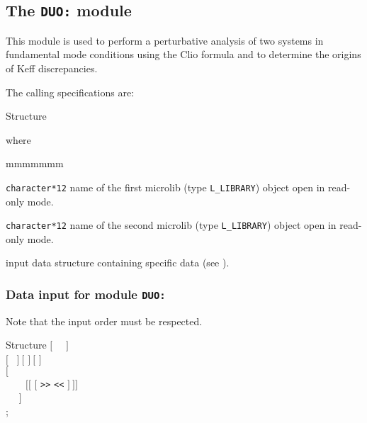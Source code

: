 \subsection{The {\tt DUO:} module}\label{sect:DUOData}

This module is used to perform a perturbative analysis of two systems in fundamental mode conditions using the Clio formula and to determine the origins
of Keff discrepancies.

\vskip 0.02cm

The calling specifications are:

\begin{DataStructure}{Structure }
~~~\moc{::}~ \\
\end{DataStructure}

\noindent where
\begin{ListeDeDescription}{mmmmmmm}

\item[\dusa{MICLIB1}] {\tt character*12} name of the first {\sc microlib} (type {\tt L\_LIBRARY}) object open in read-only mode.

\item[\dusa{MICLIB2}] {\tt character*12} name of the second {\sc microlib} (type {\tt L\_LIBRARY}) object open in read-only mode.

\item[\dusa{DUO\_data}] input data structure containing specific data (see ).

\end{ListeDeDescription}

\subsubsection{Data input for module {\tt DUO:}}\label{sect:descDUO}

Note that the input order must be respected.

\vskip -0.5cm

\begin{DataStructure}{Structure }
$[$~ ~$]$ \\
$[$~ $]~[$  $]~[$  $]$ \\
$[$  \\
~~~~$[[$  $[$   {\tt >>}  {\tt <<} $]~]] $\\
~~ $]$ \\
;
\end{DataStructure}

